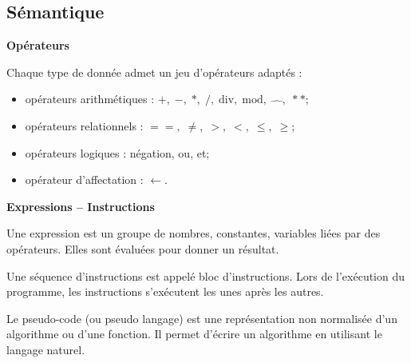 \documentclass[10pt,fleqn]{article} %
\begin{document}
\subsection{Sémantique}

\begin{defi}
\textbf{Opérateurs}

Chaque type de donnée admet un jeu d’opérateurs adaptés :
\begin{itemize}
\item opérateurs arithmétiques : $+,\; -,\; *,\; /,\; \text{div},\; \text{mod},\; \hat\quad,\; **$;
\item opérateurs relationnels : $==,\; \neq,\; >,\;<,\; \leq,\; \geq$;
\item opérateurs logiques : négation, ou, et;
\item opérateur d'affectation : $\leftarrow$.
\end{itemize}
\end{defi}


\begin{defi}
\textbf{Expressions -- Instructions}

Une expression est un groupe de nombres, constantes, variables liées par des opérateurs. Elles sont évaluées pour donner un résultat. 

Une séquence d'instructions est appelé bloc d'instructions. Lors de l'exécution du programme, les instructions s'exécutent les unes après les autres.
\end{defi}





\begin{exemple}
\end{exemple}

\begin{minipage}[c]{.47\linewidth}
Le pseudo-code (ou pseudo langage) est une représentation non normalisée d'un algorithme ou d'une fonction. Il permet d'écrire un algorithme en utilisant le langage naturel. 
\end{minipage}\hfill
\begin{minipage}[c]{.47\linewidth}
\begin{pseudo}
\begin{algorithm}[H]
\end{algorithm}
\end{pseudo}
\end{minipage}
\end{document}
